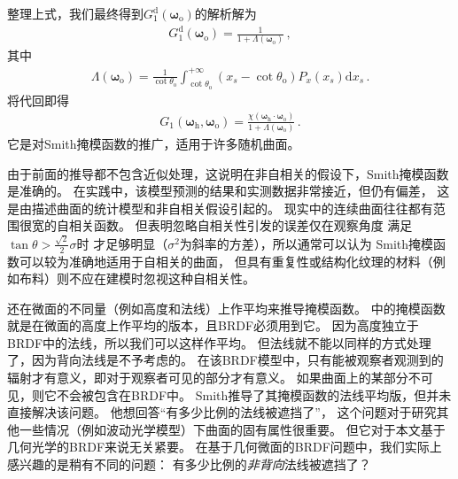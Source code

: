整理上式，我们最终得到$G_1^{\mathrm{d}}({\bm\omega}_{\mathrm{o}})$的解析解为
\begin{align}\label{eq:08-ex01-g1-d-solution}
    G_1^{\mathrm{d}}({\bm\omega}_{\mathrm{o}})=\frac{1}{1+\Lambda({\bm\omega}_{\mathrm{o}})}\, ,
\end{align}
其中
\begin{align}
    \Lambda({\bm\omega}_{\mathrm{o}})=\frac{1}{\cot\theta_{\mathrm{o}}}
    \int_{\cot\theta_{\mathrm{o}}}^{+\infty}(x_s-\cot\theta_{\mathrm{o}})P_x(x_s)\mathrm{d}x_s\, .
\end{align}
将代回即得
\begin{align}\label{eq:08-ex01-Smith-masking-function}
    G_1({\bm\omega}_{\mathrm{h}},{\bm\omega}_{\mathrm{o}})
    =\frac{\chi({\bm\omega}_{\mathrm{h}}\cdot{\bm\omega}_{\mathrm{o}})}
    {1+\Lambda({\bm\omega}_{\mathrm{o}})}\, .
\end{align}
它是对Smith掩模函数的推广，适用于许多随机曲面。

由于前面的推导都不包含近似处理，这说明在非自相关的假设下，Smith掩模函数是准确的。
在实践中，该模型预测的结果和实测数据非常接近，但仍有偏差，
这是由描述曲面的统计模型和非自相关假设引起的。
现实中的连续曲面往往都有范围很宽的自相关函数。
但\citet{841905}表明忽略自相关性引发的误差仅在观察角度
满足$\tan\theta>\frac{\sqrt{2}}{2}\sigma$时
才足够明显（$\sigma^2$为斜率的方差），所以通常可以认为
Smith掩模函数可以较为准确地适用于自相关的曲面，
但具有重复性或结构化纹理的材料（例如布料）则不应在建模时忽视这种自相关性。

\citet{1138991}还在微面的不同量（例如高度和法线）上作平均来推导掩模函数。
中的掩模函数
就是在微面的高度上作平均的版本，且BRDF必须用到它。
因为高度独立于BRDF中的法线，所以我们可以这样作平均。
但法线就不能以同样的方式处理了，因为背向法线是不予考虑的。
在该BRDF模型中，只有能被观察者观测到的辐射才有意义，即对于观察者可见的部分才有意义。
如果曲面上的某部分不可见，则它不会被包含在BRDF中。
Smith推导了其掩模函数的法线平均版，但并未直接解决该问题。
他想回答“有多少比例的法线被遮挡了”，
这个问题对于研究其他一些情况（例如波动光学模型）下曲面的固有属性很重要。
但它对于本文基于几何光学的BRDF来说无关紧要。
在基于几何微面的BRDF问题中，我们实际上感兴趣的是稍有不同的问题：
有多少比例的\emph{非背向}法线被遮挡了？

